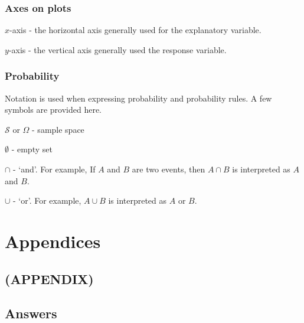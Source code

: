 \documentclass[
  oneside]{krantz}
\begin{document}
\hypertarget{axes-on-plots}{%
\section{Axes on plots}\label{axes-on-plots}}

\(x\)-axis - the horizontal axis generally used for the explanatory variable.

\(y\)-axis - the vertical axis generally used the response variable.

\hypertarget{probability-2}{%
\section{Probability}\label{probability-2}}

Notation is used when expressing probability and probability rules. A few symbols are provided here.

\(\mathcal{S}\) or \(\Omega\) - sample space

\(\emptyset\) - empty set

\(\cap\) - `and'. For example, If \(A\) and \(B\) are two events, then \(A \cap B\) is interpreted as \(A\) and \(B\).

\(\cup\) - `or'. For example, \(A \cup B\) is interpreted as \(A\) or \(B\).

\hypertarget{part-appendices}{%
\part{Appendices}\label{part-appendices}}

\hypertarget{appendix}{%
\chapter*{(APPENDIX)}\label{appendix}}


\hypertarget{answers-1}{%
\chapter{Answers}\label{answers-1}}

  

\printindex
\end{document}
